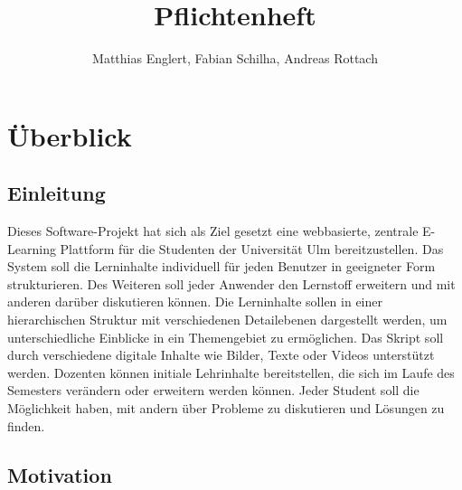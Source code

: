 \documentclass[12pt,a4paper]{article}
\author{Matthias Englert, Fabian Schilha, Andreas Rottach}
\title{Pflichtenheft}
\begin{document}
\maketitle
\newpage
\tableofcontents
\newpage
\section{Überblick}
\subsection{Einleitung}
Dieses Software-Projekt hat sich als Ziel gesetzt eine webbasierte, zentrale E-Learning Plattform für die Studenten der Universität Ulm bereitzustellen. Das System soll die Lerninhalte individuell für jeden Benutzer in geeigneter Form strukturieren. Des Weiteren soll jeder Anwender den Lernstoff erweitern und mit anderen darüber diskutieren können. Die Lerninhalte sollen in einer hierarchischen Struktur mit verschiedenen Detailebenen dargestellt werden, um unterschiedliche Einblicke in ein Themengebiet zu ermöglichen. Das Skript soll durch verschiedene digitale Inhalte wie Bilder, Texte oder Videos unterstützt werden. Dozenten können initiale Lehrinhalte bereitstellen, die sich im Laufe des Semesters verändern oder erweitern werden können. 
Jeder Student soll die Möglichkeit haben, mit andern über Probleme zu diskutieren und Lösungen zu finden.

\subsection{Motivation}
\end{document}
